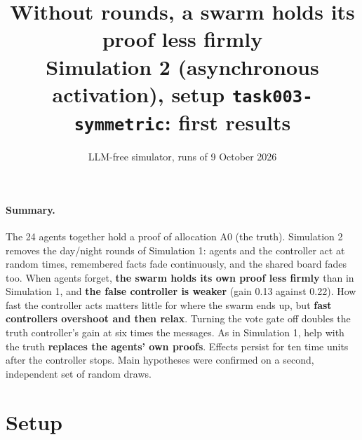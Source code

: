 \documentclass[10pt,a4paper]{article}
\title{\vspace{-1.2cm}\textbf{Without rounds, a swarm holds its proof less firmly}\\[2pt]
\large Simulation 2 (asynchronous activation), setup \texttt{task003-symmetric}: first results}
\author{LLM-free simulator, runs of 9 October 2026}
\date{}
\begin{document}
\maketitle
\vspace{-1cm}

\paragraph{Summary.} The 24 agents together hold a proof of allocation A0 (the truth).
Simulation 2 removes the day/night rounds of Simulation 1: agents and the controller act at
random times, remembered facts fade continuously, and the shared board fades too. When
agents forget, \textbf{the swarm holds its own proof less firmly} than in Simulation 1, and
\textbf{the false controller is weaker} (gain 0.13 against 0.22). How fast the controller
acts matters little for where the swarm ends up, but \textbf{fast controllers overshoot and
then relax}. Turning the vote gate off doubles the truth controller's gain at six times
the messages. As in Simulation 1, help with the truth \textbf{replaces the agents' own
proofs}. Effects persist for ten time units after the controller stops. Main hypotheses
were confirmed on a second, independent set of random draws.

\section{Setup}
\end{document}
